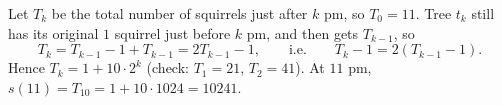 Let $T_k$ be the total number of squirrels just after $k$ pm, so $T_0=11$. Tree $t_k$ still has its original $1$ squirrel just before $k$ pm, and then gets $T_{k-1}$, so
\[T_k=T_{k-1}-1+T_{k-1}=2T_{k-1}-1,\qquad\text{i.e.}\qquad T_k-1=2(T_{k-1}-1).\]
Hence $T_k=1+10\cdot2^k$ (check: $T_1=21$, $T_2=41$). At $11$ pm, $s(11)=T_{10}=1+10\cdot1024=\boxed{10241}$.

